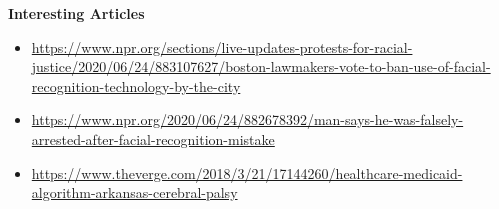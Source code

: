 \documentclass[12pt]{../notes}
\begin{document}

\begin{minipage}[l][4cm][c]{\textwidth}
\begin{comment}
\note{If we use historical data to train our models (say loan default risk), and those historical decisions were made in a prejudiced way, the model will likewise learn to be prejudiced. Also, confounding variables (an unaccounted for variable that is highly correlated with two other variables and makes the two other variables look correlated with each other) make can make things like ``race'' or ``gender'' drive model predictions, even if those variables are actually included in the model.}
\end{comment}
\end{minipage}


\begin{minipage}[l][4cm][c]{\textwidth}
\begin{comment}
\note{There is no right answer here. However, a better understanding of how our predictive models work will help us know how and when the results might betray us. At the very least, recognizing the shortcoming of ``objective'' modeling approaches will change the way we try to use them.}
\end{comment}
\end{minipage}

\nspace
\textbf{Interesting Articles}
\begin{itemize}
\item \url{https://www.npr.org/sections/live-updates-protests-for-racial-justice/2020/06/24/883107627/boston-lawmakers-vote-to-ban-use-of-facial-recognition-technology-by-the-city}
\item \url{https://www.npr.org/2020/06/24/882678392/man-says-he-was-falsely-arrested-after-facial-recognition-mistake}
\item \url{https://www.theverge.com/2018/3/21/17144260/healthcare-medicaid-algorithm-arkansas-cerebral-palsy}
\end{itemize}


\end{document}
